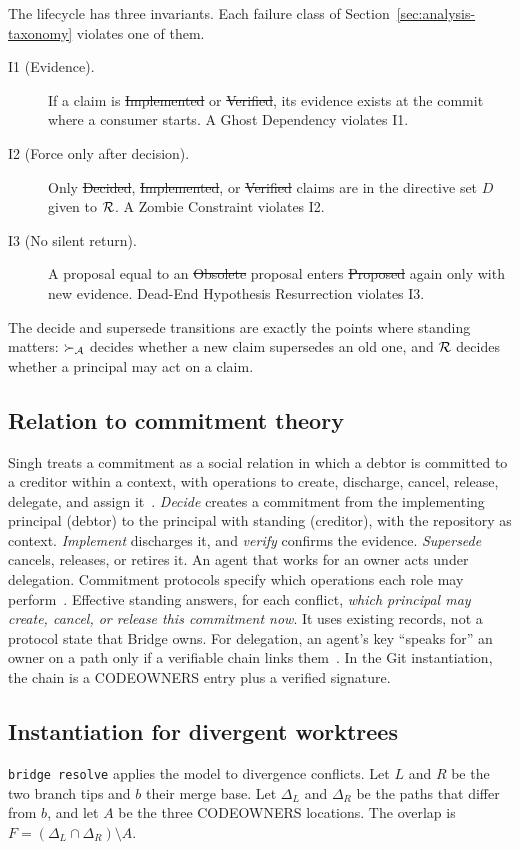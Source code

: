 The lifecycle has three invariants. Each failure class of Section~\ref{sec:analysis-taxonomy} violates one of them.
\begin{description}
    \item[I1 (Evidence).] If a claim is \st{Implemented} or \st{Verified}, its evidence exists at the commit where a consumer starts. A Ghost Dependency violates I1.
    \item[I2 (Force only after decision).] Only \st{Decided}, \st{Implemented}, or \st{Verified} claims are in the directive set $D$ given to $\mathcal{R}$. A Zombie Constraint violates I2.
    \item[I3 (No silent return).] A proposal equal to an \st{Obsolete} proposal enters \st{Proposed} again only with new evidence. Dead-End Hypothesis Resurrection violates I3.
\end{description}
The decide and supersede transitions are exactly the points where standing matters: $\succ_{\mathcal{A}}$ decides whether a new claim supersedes an old one, and $\mathcal{R}$ decides whether a principal may act on a claim.

\subsection{Relation to commitment theory}
Singh treats a commitment as a social relation in which a debtor is committed to a creditor within a context, with operations to create, discharge, cancel, release, delegate, and assign it~\cite{singh1999commit}. \emph{Decide} creates a commitment from the implementing principal (debtor) to the principal with standing (creditor), with the repository as context. \emph{Implement} discharges it, and \emph{verify} confirms the evidence. \emph{Supersede} cancels, releases, or retires it. An agent that works for an owner acts under delegation. Commitment protocols specify which operations each role may perform~\cite{yolum2002flexible}. Effective standing answers, for each conflict, \emph{which principal may create, cancel, or release this commitment now}. It uses existing records, not a protocol state that Bridge owns. For delegation, an agent's key ``speaks for'' an owner on a path only if a verifiable chain links them~\cite{lampson1992authentication,abadi1993calculus}. In the Git instantiation, the chain is a CODEOWNERS entry plus a verified signature.

\subsection{Instantiation for divergent worktrees}
\label{sec:framework-git}
\texttt{bridge resolve} applies the model to divergence conflicts. Let $L$ and $R$ be the two branch tips and $b$ their merge base. Let $\Delta_L$ and $\Delta_R$ be the paths that differ from $b$, and let $A$ be the three CODEOWNERS locations. The overlap is $F = (\Delta_L \cap \Delta_R) \setminus A$.

